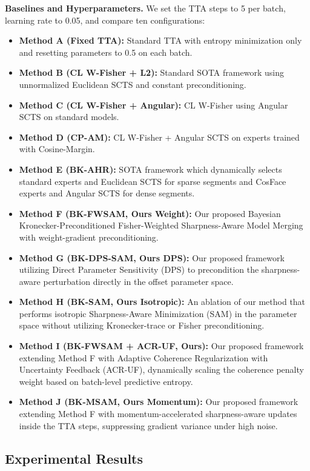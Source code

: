 \documentclass{article}
\theoremstyle{plain}
\theoremstyle{definition}
\theoremstyle{remark}
\begin{document}
\textbf{Baselines and Hyperparameters.} We set the TTA steps to 5 per batch, learning rate to 0.05, and compare ten configurations:
\begin{itemize}
  \item \textbf{Method A (Fixed TTA):} Standard TTA with entropy minimization only and resetting parameters to 0.5 on each batch.
  \item \textbf{Method B (CL W-Fisher + L2):} Standard SOTA framework using unnormalized Euclidean SCTS and constant preconditioning.
  \item \textbf{Method C (CL W-Fisher + Angular):} CL W-Fisher using Angular SCTS on standard models.
  \item \textbf{Method D (CP-AM):} CL W-Fisher + Angular SCTS on experts trained with Cosine-Margin.
  \item \textbf{Method E (BK-AHR):} SOTA framework which dynamically selects standard experts and Euclidean SCTS for sparse segments and CosFace experts and Angular SCTS for dense segments.
  \item \textbf{Method F (BK-FWSAM, Ours Weight):} Our proposed Bayesian Kronecker-Preconditioned Fisher-Weighted Sharpness-Aware Model Merging with weight-gradient preconditioning.
  \item \textbf{Method G (BK-DPS-SAM, Ours DPS):} Our proposed framework utilizing Direct Parameter Sensitivity (DPS) to precondition the sharpness-aware perturbation directly in the offset parameter space.
  \item \textbf{Method H (BK-SAM, Ours Isotropic):} An ablation of our method that performs isotropic Sharpness-Aware Minimization (SAM) in the parameter space without utilizing Kronecker-trace or Fisher preconditioning.
  \item \textbf{Method I (BK-FWSAM + ACR-UF, Ours):} Our proposed framework extending Method F with Adaptive Coherence Regularization with Uncertainty Feedback (ACR-UF), dynamically scaling the coherence penalty weight based on batch-level predictive entropy.
  \item \textbf{Method J (BK-MSAM, Ours Momentum):} Our proposed framework extending Method F with momentum-accelerated sharpness-aware updates inside the TTA steps, suppressing gradient variance under high noise.
\end{itemize}

\subsection{Experimental Results}
\end{document}
